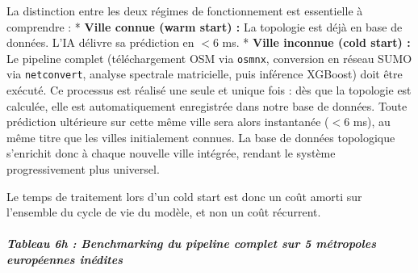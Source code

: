\documentclass[10pt, a4paper]{article}
\begin{document}
La distinction entre les deux régimes de fonctionnement est essentielle
à comprendre : * \textbf{Ville connue (warm start) :} La topologie est
déjà en base de données. L'IA délivre sa prédiction en \(< 6\) ms. *
\textbf{Ville inconnue (cold start) :} Le pipeline complet
(téléchargement OSM via \texttt{osmnx}, conversion en réseau SUMO via
\texttt{netconvert}, analyse spectrale matricielle, puis inférence
XGBoost) doit être exécuté. Ce processus est réalisé une seule et unique
fois : dès que la topologie est calculée, elle est automatiquement
enregistrée dans notre base de données. Toute prédiction ultérieure sur
cette même ville sera alors instantanée (\(< 6\) ms), au même titre que
les villes initialement connues. La base de données topologique
s'enrichit donc à chaque nouvelle ville intégrée, rendant le système
progressivement plus universel.

Le temps de traitement lors d'un cold start est donc un coût amorti sur
l'ensemble du cycle de vie du modèle, et non un coût récurrent.

\subparagraph{Tableau 6h : Benchmarking du pipeline complet sur 5
métropoles européennes
inédites}\label{tableau-6h-benchmarking-du-pipeline-complet-sur-5-muxe9tropoles-europuxe9ennes-inuxe9dites}
\end{document}
